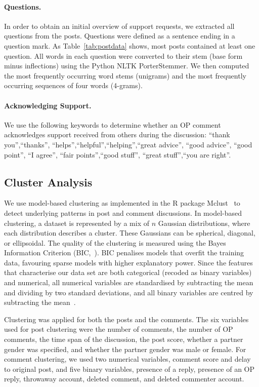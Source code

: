 \paragraph{Questions.} In order to obtain an initial overview of support requests, we extracted all questions from the posts. Questions were defined as a sentence ending in a question mark.  As Table~\ref{tab:postdata} shows, most posts contained at least one question. All words in each question were converted to their stem (base form minus inflections) using the Python NLTK PorterStemmer. We then computed the most frequently occurring word stems (unigrams) and the most frequently occurring sequences of four words (4-grams). 

\paragraph{Acknowledging Support.} We use the following keywords to determine whether an OP comment acknowledges support received from others during the discussion: ``thank you'',``thanks'', ``helps'',``helpful'',``helping'',``great advice'', ``good advice'', ``good point'', ``I agree'', ``fair points'',``good stuff'', ``great stuff'',``you are right''. 




\subsection{Cluster Analysis}

We use model-based clustering as implemented in the R package Mclust~\cite{mclust} to detect underlying patterns in post and comment discussions. In model-based clustering, a dataset is represented by a mix of $n$ Gaussian distributions, where each distribution describes a cluster. These Gaussians can be spherical, diagonal, or ellipsoidal. The quality of the clustering is measured using the Bayes Information Criterion (BIC,~\cite{schwarz_estimating_1978}). BIC penalises models that overfit the training data, favouring sparse models with higher explanatory power. Since the features that characterise our data set are both categorical (recoded as binary variables) and numerical, all numerical variables are standardised by subtracting the mean and dividing by two standard deviations, and all binary variables are centred by subtracting the mean~\cite{gelman_scaling_2008}.

Clustering was applied for both the posts and the comments. The six variables used for post clustering were the number of comments, the number of OP comments, the time span of the discussion, the post score, whether a partner gender was specified, and whether the partner gender was male or female. For comment clustering, we used two numerical variables, comment score and delay to original post, and five binary variables, presence of a reply, presence of an OP reply,  throwaway account, deleted comment, and deleted commenter account. 

